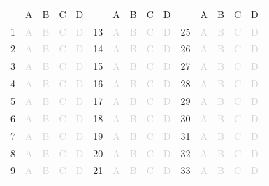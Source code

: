 \documentclass[a4paper,11pt]{article}
\newcommand{\light}[1]{\textcolor{lightgray}{#1}}
\begin{document}
\begin{center}
\small
\renewcommand{\arraystretch}{1.4}
\begin{tabular}{r|c|c|c|c|r|c|c|c|c|r|c|c|c|c|}
\multicolumn{1}{c}{} &
\multicolumn{1}{c}{A}&
\multicolumn{1}{c}{B}&
\multicolumn{1}{c}{C}&
\multicolumn{1}{c}{D}& \multicolumn{1}{c}{} &
\multicolumn{1}{c}{A}&
\multicolumn{1}{c}{B}&
\multicolumn{1}{c}{C}&
\multicolumn{1}{c}{D}& \multicolumn{1}{c}{} &
\multicolumn{1}{c}{A}&
\multicolumn{1}{c}{B}&
\multicolumn{1}{c}{C}&
\multicolumn{1}{c}{D}\\ 
\cline{2-5} \cline{7-10} \cline{12-15}
1& \light{A} & \light{B} & \light{C} & \light{D} & 13& \light{A} & \light{B} & \light{C} & \light{D} & 25& \light{A} & \light{B} & \light{C} & \light{D} \\ 
\cline{2-5} \cline{7-10} \cline{12-15}
2& \light{A} & \light{B} & \light{C} & \light{D} & 14& \light{A} & \light{B} & \light{C} & \light{D} & 26& \light{A} & \light{B} & \light{C} & \light{D} \\ 
\cline{2-5} \cline{7-10} \cline{12-15}
3& \light{A} & \light{B} & \light{C} & \light{D} & 15& \light{A} & \light{B} & \light{C} & \light{D} & 27& \light{A} & \light{B} & \light{C} & \light{D} \\ 
\cline{2-5} \cline{7-10} \cline{12-15}
4& \light{A} & \light{B} & \light{C} & \light{D} & 16& \light{A} & \light{B} & \light{C} & \light{D} & 28& \light{A} & \light{B} & \light{C} & \light{D} \\ 
\cline{2-5} \cline{7-10} \cline{12-15}
5& \light{A} & \light{B} & \light{C} & \light{D} & 17& \light{A} & \light{B} & \light{C} & \light{D} & 29& \light{A} & \light{B} & \light{C} & \light{D} \\ 
\cline{2-5} \cline{7-10} \cline{12-15}
6& \light{A} & \light{B} & \light{C} & \light{D} & 18& \light{A} & \light{B} & \light{C} & \light{D} & 30& \light{A} & \light{B} & \light{C} & \light{D} \\ 
\cline{2-5} \cline{7-10} \cline{12-15}
7& \light{A} & \light{B} & \light{C} & \light{D} & 19& \light{A} & \light{B} & \light{C} & \light{D} & 31& \light{A} & \light{B} & \light{C} & \light{D} \\ 
\cline{2-5} \cline{7-10} \cline{12-15}
8& \light{A} & \light{B} & \light{C} & \light{D} & 20& \light{A} & \light{B} & \light{C} & \light{D} & 32& \light{A} & \light{B} & \light{C} & \light{D} \\ 
\cline{2-5} \cline{7-10} \cline{12-15}
9& \light{A} & \light{B} & \light{C} & \light{D} & 21& \light{A} & \light{B} & \light{C} & \light{D} & 33& \light{A} & \light{B} & \light{C} & \light{D} \\ 

\end{tabular}
\end{center}
\end{document}
